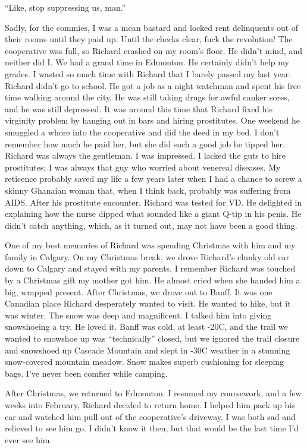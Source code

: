 ``Like, stop suppressing us, man.''

Sadly, for the commies, I was a mean bastard and locked rent delinquents
out of their rooms until they paid up. Until the checks clear, fuck the
revolution! The cooperative was full, so Richard crashed on my room's
floor. He didn't mind, and neither did I. We had a grand time in
Edmonton. He certainly didn't help my grades. I wasted so much time with
Richard that I barely passed my last year. Richard didn't go to school.
He got a job as a night watchman and spent his free time walking around
the city. He was still taking drugs for awful canker sores, and he was
still depressed. It was around this time that Richard fixed his
virginity problem by hanging out in bars and hiring prostitutes. One
weekend he smuggled a whore into the cooperative and did the deed in my
bed. I don't remember how much he paid her, but she did such a good job
he tipped her. Richard was always the gentleman. I was impressed. I
lacked the guts to hire prostitutes; I was always that guy who worried
about venereal diseases. My reticence probably saved my life a few years
later when I had a chance to screw a skinny Ghanaian woman that, when I
think back, probably was suffering from AIDS. After his prostitute
encounter, Richard was tested for VD. He delighted in explaining how the
nurse dipped what sounded like a giant Q-tip in his penis. He didn't
catch anything, which, as it turned out, may not have been a good thing.

One of my best memories of Richard was spending Christmas with him and
my family in Calgary. On my Christmas break, we drove Richard's clunky
old car down to Calgary and stayed with my parents. I remember Richard
was touched by a Christmas gift my mother got him. He almost cried when
she handed him a big, wrapped present. After Christmas, we drove out to
Banff. It was one Canadian place Richard desperately wanted to visit. He
wanted to hike, but it was winter. The snow was deep and magnificent. I
talked him into giving snowshoeing a try. He loved it. Banff was cold,
at least -20C, and the trail we wanted to snowshoe up was
``technically'' closed, but we ignored the trail closure and snowshoed
up Cascade Mountain and slept in -30C weather in a stunning snow-covered
mountain meadow. Snow makes superb cushioning for sleeping bags. I've
never been comfier while camping.

After Christmas, we returned to Edmonton. I resumed my coursework, and a
few weeks into February, Richard decided to return home. I helped him
pack up his car and watched him pull out of the cooperative's driveway.
I was both sad and relieved to see him go. I didn't know it then, but
that would be the last time I'd ever see him.

